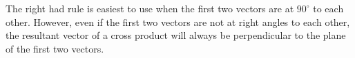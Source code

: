 The right had rule is easiest to use when the first two vectors are at $90^\circ$ to each other.  However, even if the first two vectors are not at right angles to each other, the resultant vector of a cross product will always be perpendicular to the plane of the first two vectors.  







%				
%		
%		
	



